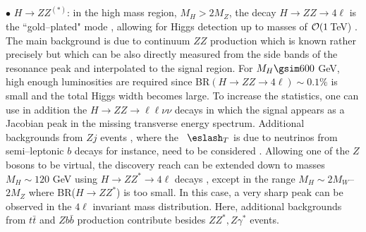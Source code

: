$\bullet$ \underline{$H \to ZZ^{(*)}$}: in the high mass region, $M_H >2M_Z$,
the decay $H \to ZZ \to 4\ell$ is the ``gold--plated" mode
\cite{pp-Galison,pp-Wudka,pp-EHLQ,pp-HWW-Theory}, allowing for Higgs detection
up to masses of ${\cal O}(1\,$TeV) \cite{ATLAS-TDR,pp-HZZ-4l,pp-HZZ-4l-new}.
The main background is due to continuum $ZZ$ production which is known rather
precisely \cite{pp-bkg-WW,pp-bkg-ZZ} but which can be also directly measured
from the side bands of the resonance peak and interpolated to the signal
region. For $ M_H \gsim 600$ GeV, high enough luminosities are required  since
BR$(H\to ZZ \to 4\ell) \sim 0.1\%$ is small and the total Higgs width becomes
large.  To increase the statistics,  one can use in addition the $H \to ZZ \to
\ell \ell \nu \nu$ decays \cite{pp-HZZ-llnnTheory} in which the signal appears
as a Jacobian peak in the missing transverse energy spectrum. Additional
backgrounds from $Zj$ events \cite{pp-bkg-Vjj}, where the ~$\eslash_T$ is due
to neutrinos from semi--leptonic $b$ decays for instance, need to be considered
\cite{pp-HZZ-llnn}. Allowing one of the $Z$ bosons to be virtual, the discovery
reach can be extended down to masses $M_H \sim 120$ GeV using $H \to ZZ^* \to
4\ell$ decays \cite{pp-HZZ-4low}, except in the range $M_H \sim 2M_W$--$2M_Z$
where BR($H\to ZZ^*$) is too small. In this case, a very sharp peak can be
observed in the $4\ell$ invariant mass distribution. Here, additional
backgrounds from $t\bar t$ \cite{pp-bkg-tt} and $Zb\bar b$ \cite{pp-bkg-Vjj}
production contribute besides $ZZ^*, Z\gamma^*$ events.\s 

